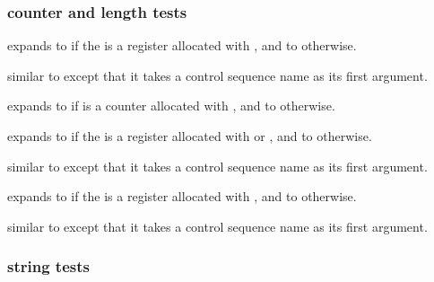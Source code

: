 \subsubsection{counter and length tests}
\label{aut:tst:cnt}

\begin{ltxsyntax}


expands to  if the  is a \tex {} register allocated with , and to  otherwise.


similar to  except that it takes a control sequence name as its first argument.


expands to  if  is a \latex counter allocated with , and to  otherwise.


expands to  if the  is a \tex {} register allocated with  or , and to  otherwise.


similar to  except that it takes a control sequence name as its first argument.


expands to  if the  is a \tex {} register allocated with , and to  otherwise.


similar to  except that it takes a control sequence name as its first argument.

\end{ltxsyntax}

\subsubsection{string tests}
\label{aut:tst:str}


